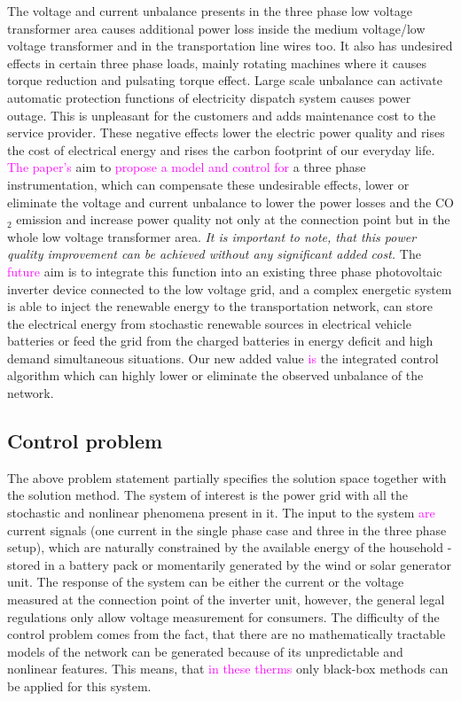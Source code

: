     The voltage and current unbalance presents in the three phase low voltage transformer area causes additional power loss inside the medium voltage/low voltage transformer and in the transportation line wires too. It also has undesired effects in certain three phase loads, mainly rotating machines where it causes torque reduction and pulsating torque effect. Large scale unbalance can activate automatic protection functions of electricity dispatch system causes power outage. This is unpleasant for the customers and adds maintenance cost to the service provider. These negative effects lower the electric power quality and rises the cost of electrical energy and rises the carbon footprint of our everyday life.  \textcolor{magenta}{The paper's} aim to \textcolor{magenta}{propose a model and control for} a three phase instrumentation, which can compensate these undesirable effects, lower or eliminate the voltage and current unbalance to lower the power losses and the CO${}_2$ emission and increase power quality not only at the connection point but in the whole low voltage transformer area. \emph{It is important to note, that this power quality improvement can be achieved without any significant added cost.} The \textcolor{magenta}{future} aim is to integrate this function into an existing three phase photovoltaic inverter device connected to the low voltage grid, and a  complex energetic system is able to inject the renewable energy to the transportation network, can store the electrical energy from stochastic renewable sources in electrical vehicle batteries or feed the grid from the charged batteries in energy deficit and high demand simultaneous situations. Our new added value \textcolor{magenta}{is} the integrated control algorithm which can highly lower or eliminate the observed unbalance of the network.

    \subsection{Control problem}

    The above problem statement partially specifies the solution space together with the solution method. The system of interest is the power grid with all the stochastic and nonlinear phenomena present in it. The input to the system \textcolor{magenta}{are} current signals (one current in the single phase case and three in the three phase setup), which are naturally constrained by the available energy of the household - stored in a battery pack or momentarily generated by the wind or solar generator unit. The response of the system can be either the current or the voltage measured at the connection point of the inverter unit, however, the general legal regulations only allow voltage measurement for consumers. The difficulty of the control problem comes from the fact, that there are no mathematically tractable models of the network can be generated because of its unpredictable and nonlinear features. This means, that \textcolor{magenta}{in these therms} only black-box methods can be applied for this system.


